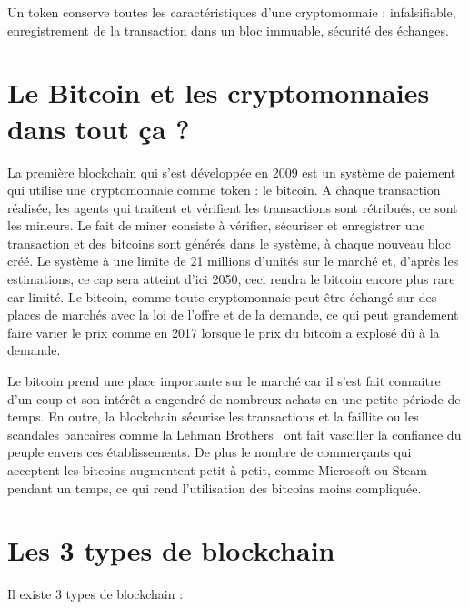 \documentclass[12pt, a4paper, oneside]{book}
\begin{document}
Un token conserve toutes les caractéristiques d’une cryptomonnaie : infalsifiable, enregistrement de la transaction dans un bloc immuable, sécurité des échanges.

\section{Le Bitcoin et les cryptomonnaies dans tout ça ?}
La première blockchain qui s’est développée en 2009 est un système de paiement qui utilise une cryptomonnaie comme token : le bitcoin. 
A chaque transaction réalisée, les agents qui traitent et vérifient les transactions sont rétribués, ce sont les mineurs. Le fait de miner consiste à vérifier, sécuriser et enregistrer une transaction et des bitcoins sont générés dans le système, à chaque nouveau bloc créé.
 Le système à une limite de 21 millions d’unités sur le marché et, d’après les estimations, ce cap sera atteint d’ici 2050, ceci rendra le bitcoin encore plus rare car limité. Le bitcoin, comme toute cryptomonnaie peut être échangé sur des places de marchés avec la loi de l’offre et de la demande, ce qui peut grandement faire varier le prix comme en 2017 lorsque le prix du bitcoin a explosé dû à la demande.

Le bitcoin prend une place importante sur le marché car il s'est fait connaitre d'un coup et son intérêt a engendré de nombreux achats en une petite période de temps. En outre, la blockchain sécurise les transactions et la faillite ou les scandales bancaires comme la Lehman Brothers~\cite{Lehman} ont fait vasciller la confiance du peuple envers ces établissements.
De plus le nombre de commerçants qui acceptent les bitcoins augmentent petit à petit, comme Microsoft ou Steam pendant un temps, ce qui rend l'utilisation des bitcoins moins compliquée.

\section{Les 3 types de blockchain}

Il existe 3 types de blockchain :
\\
\end{document}
